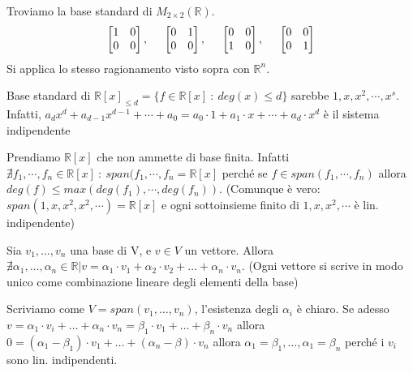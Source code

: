 \begin{example}
Troviamo la base standard di $M_{2\times2}(\mathbb{R})$.
\[\begin{bmatrix}1&0\\0&0\end{bmatrix}, \hspace{.5cm} \begin{bmatrix}0&1\\0&0\end{bmatrix}, \hspace{.5cm} \begin{bmatrix}0&0\\1&0\end{bmatrix}, \hspace{.5cm} \begin{bmatrix}0&0\\0&1\end{bmatrix}\]
Si applica lo stesso ragionamento visto sopra con $\mathbb{R}^n$.
\end{example}

\begin{example}
Base standard di $\mathbb{R}[x]_{\leq d} = \{f \in \mathbb{R}[x] \::\: deg(x) \leq d\}$ sarebbe $1, x, x^2, \cdots, x^s$. Infatti, $a_dx^d + a_{d-1}x^{d-1} + \cdots + a_0 = a_0 \cdot 1 + a_1 \cdot x + \cdots + a_d \cdot x^d$ è il sistema indipendente
\end{example}
\begin{example}
Prendiamo $\mathbb{R}[x]$ che non ammette di base finita. Infatti $\nexists f_1, \cdots, f_n \in \mathbb{R}[x] \::\: span(f_1, \cdots, f_n = \mathbb{R}[x]$ perché se $f \in span(f_1, \cdots, f_n)$ allora $deg(f) \leq max(deg(f_1), \cdots, deg(f_n))$. (Comunque è vero: $span(1,x,x^2, x^2, \cdots) = \mathbb{R}[x]$ e ogni sottoinsieme finito di $1,x, x^2, \cdots$ è lin. indipendente)
\end{example}

\begin{proposition}
	Sia $v_1, \ldots, v_n$ una base di V, e $v \in V$ un vettore. Allora $\nexists  \alpha_1, \ldots, \alpha_n \in \mathbb{R} \vert v = \alpha_1\cdot v_1 + \alpha_2\cdot v_2 + \ldots + \alpha_n\cdot v_n$. (Ogni vettore si scrive in modo unico come combinazione lineare degli elementi della base)
\end{proposition}

\begin{demostration}
	Scriviamo come $V = span(v_1, \ldots, v_n)$, l'esistenza degli $\alpha_i$ è chiaro. Se adesso $v = \alpha_1\cdot v_i + \ldots + \alpha_n\cdot v_n = \beta_1\cdot v_1 + \ldots + \beta_n\cdot v_n$ allora $0 = (\alpha_1 - \beta_1)\cdot v_1 + \ldots + (\alpha_n - \beta)\cdot v_n$ allora $\alpha_1 = \beta_1, \ldots, \alpha_1 = \beta_n$ perché i $v_i$ sono lin. indipendenti.
\end{demostration}

